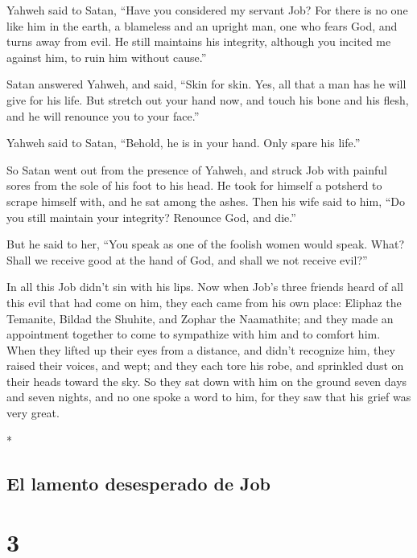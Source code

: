 \begin{paracol}{2}
\begin{otherlanguage}{english}
 Yahweh said to Satan, ``Have you considered my servant
Job? For there is no one like him in the earth, a blameless and an
upright man, one who fears God, and turns away from evil. He still
maintains his integrity, although you incited me against him, to ruin
him without cause.''

 Satan answered Yahweh, and said, ``Skin for skin. Yes,
all that a man has he will give for his life.  But stretch
out your hand now, and touch his bone and his flesh, and he will
renounce you to your face.''

 Yahweh said to Satan, ``Behold, he is in your hand. Only
spare his life.''

 So Satan went out from the presence of Yahweh, and struck
Job with painful sores from the sole of his foot to his head.
 He took for himself a potsherd to scrape himself with,
and he sat among the ashes.  Then his wife said to him,
``Do you still maintain your integrity? Renounce God, and die.''

 But he said to her, ``You speak as one of the foolish
women would speak. What? Shall we receive good at the hand of God, and
shall we not receive evil?''

In all this Job didn't sin with his lips.  Now when Job's
three friends heard of all this evil that had come on him, they each
came from his own place: Eliphaz the Temanite, Bildad the Shuhite, and
Zophar the Naamathite; and they made an appointment together to come to
sympathize with him and to comfort him.  When they lifted
up their eyes from a distance, and didn't recognize him, they raised
their voices, and wept; and they each tore his robe, and sprinkled dust
on their heads toward the sky.  So they sat down with him
on the ground seven days and seven nights, and no one spoke a word to
him, for they saw that his grief was very great.

\end{otherlanguage}

\switchcolumn[0]*

\hypertarget{el-lamento-desesperado-de-job}{%
\subsection{El lamento desesperado de
Job}\label{el-lamento-desesperado-de-job}}

\hypertarget{section-4}{%
\section{3}\label{section-4}}


\end{paracol}
